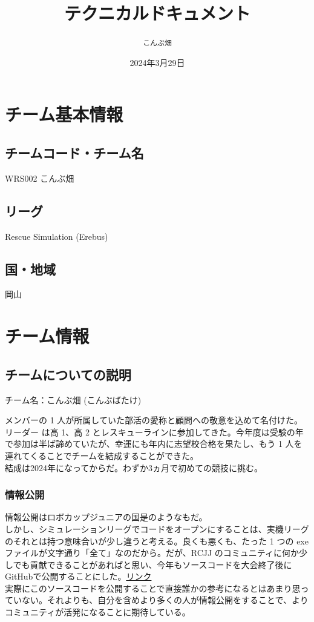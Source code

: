 \documentclass[dvipdfmx,a4paper]{jsarticle}
\title{\vspace{-1cm}テクニカルドキュメント}
\author{\texttt{こんぶ畑}}
\date{2024年3月29日}
\begin{document}
  \maketitle
  \section{チーム基本情報}
    
    \subsection{チームコード・チーム名}
    WRS002 こんぶ畑
    \subsection{リーグ}
    Rescue Simulation (Erebus)
    \subsection{国・地域}
    岡山

  \section{チーム情報}
    \subsection{チームについての説明}
    \noindent
    チーム名：こんぶ畑 (こんぶばたけ)

    \noindent
    メンバーの 1 人が所属していた部活の愛称と顧問への敬意を込めて名付けた。\\
    リーダー は高 1、高 2 とレスキューラインに参加してきた。今年度は受験の年で参加は半ば諦めていたが、幸運にも年内に志望校合格を果たし、もう 1 人を連れてくることでチームを結成することができた。\\
    結成は2024年になってからだ。わずか3ヵ月で初めての競技に挑む。

    \subsubsection{情報公開}
    \noindent
    情報公開はロボカップジュニアの国是のようなもだ。\\
    しかし、シミュレーションリーグでコードをオープンにすることは、実機リーグのそれとは持つ意味合いが少し違うと考える。良くも悪くも、たった 1 つの exe ファイルが文字通り「全て」なのだから。だが、RCJJ のコミュニティに何か少しでも貢献できることがあればと思い、今年もソースコードを大会終了後にGitHubで公開することにした。\href{https://github.com/KOMBU-Batake}{リンク}\\
    実際にこのソースコードを公開することで直接誰かの参考になるとはあまり思っていない。それよりも、自分を含めより多くの人が情報公開をすることで、よりコミュニティが活発になることに期待している。
\end{document}
